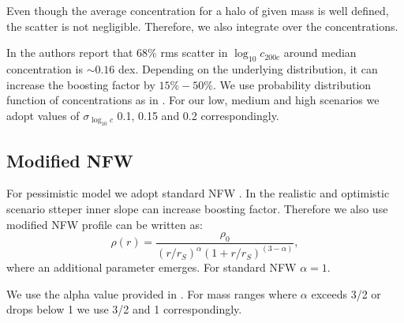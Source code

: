 Even though the average concentration for a halo of given mass is well defined, the scatter is not negligible. Therefore, we also integrate over the concentrations.

In \citet{Diemer_2015} the authors report that 68\% rms scatter in $\log_{10}c_{200c}$ around median concentration is $\sim 0.16$ dex. Depending on the underlying distribution, it can increase the boosting factor by $15\%-50\%$. We use probability distribution function of concentrations as in \cite{2014arXiv1412.4308M}. For our low, medium and high scenarios we adopt values of $\sigma_{\log_{10} c}$ 0.1, 0.15 and 0.2 correspondingly.

\subsection{Modified NFW}
For pessimistic model we adopt standard NFW \cite{1997ApJ...490..493N}. In the realistic and optimistic scenario stteper inner slope can increase boosting factor. Therefore we also use modified NFW profile can be written as:
\begin{equation}
\rho(r) = \dfrac{\rho_0}{(r/r_S)^\alpha(1+r/r_S)^{(3-\alpha)}},
\end{equation}
where an additional parameter \alpha emerges. For standard NFW $\alpha=1$.


We use the alpha value provided in \cite{Ishiyama_2014}. For mass ranges where $\alpha$ exceeds 3/2 or drops below 1 we use 3/2 and 1 correspondingly.